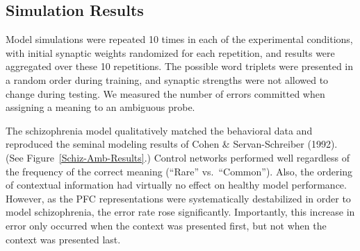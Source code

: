\subsection{Simulation Results}

Model simulations were repeated 10 times in each of the experimental conditions, with initial synaptic weights randomized for each repetition, and results were aggregated over these 10 repetitions. The possible word triplets were presented in a random order during training, and synaptic strengths were not allowed to change during testing. We measured the number of errors committed when assigning a meaning to an ambiguous probe.

The schizophrenia model qualitatively matched the behavioral data and reproduced the seminal modeling results of Cohen \& Servan-Schreiber (1992). (See Figure~\ref{Schiz-Amb-Results}.) Control networks performed well regardless of the frequency of the correct meaning (``Rare'' vs.\ ``Common''). Also, the ordering of contextual information had virtually no effect on healthy model performance. However, as the PFC representations were systematically destabilized in order to model schizophrenia, the error rate rose significantly. Importantly, this increase in error only occurred when the context was presented first, but not when the context was presented last. 

